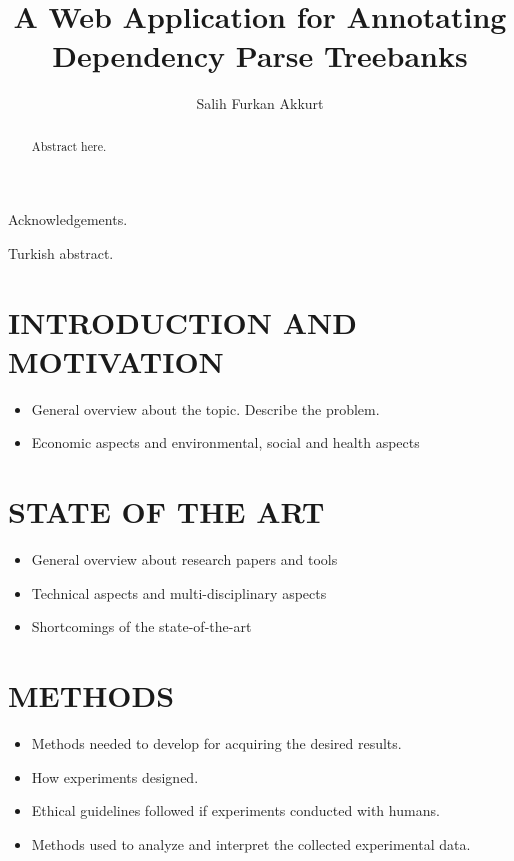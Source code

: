 \documentclass[a4paper,onesided,12pt]{report}
\title{A Web Application for Annotating Dependency Parse Treebanks}
\author{Salih Furkan Akkurt}
\begin{document}
\makebstitle  %
\makeapprovalpage
\begin{acknowledgements}
Acknowledgements.
\end{acknowledgements}
\begin{abstract}
    Abstract here.
\end{abstract}
\begin{ozet}
    Turkish abstract.
\end{ozet}
\tableofcontents
\listoffigures
\listoftables
\begin{symbols}


\end{symbols}

\begin{abbreviations}
\end{abbreviations}


\chapter{INTRODUCTION AND MOTIVATION}
\label{chapter:introduction}
\begin{itemize}
\item General overview about the topic. Describe the problem.
\item Economic aspects and environmental, social and health aspects
\end{itemize}

\chapter{STATE OF THE ART}
\label{chapter:state-of-the-art}
\begin{itemize}
\item General overview about research papers and tools
\item Technical aspects and multi-disciplinary aspects
\item Shortcomings of the state-of-the-art
\end{itemize}


\chapter{METHODS}
\label{chapter:methods}
\begin{itemize}
\item Methods needed to develop for acquiring the desired results.
\item How experiments designed.
\item Ethical guidelines followed if experiments conducted with humans.
\item Methods used to analyze and interpret the collected experimental data.
\end{itemize}
\end{document}
